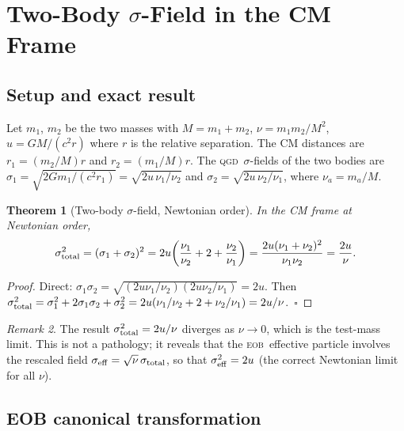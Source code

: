 \documentclass[11pt,a4paper]{article}
\theoremstyle{plain}
\newtheorem{theorem}{Theorem}[section]
\theoremstyle{remark}
\newtheorem{remark}[theorem]{Remark}
\newcommand{\QGD}{\textsc{qgd}}
\newcommand{\EOB}{\textsc{eob}}
\begin{document}
\section{Two-Body $\sigma$-Field in the CM Frame}

\subsection{Setup and exact result}

Let $m_1$, $m_2$ be the two masses with $M=m_1+m_2$, $\nu=m_1 m_2/M^2$,
$u=GM/(c^2 r)$ where $r$ is the relative separation.
The CM distances are $r_1 = (m_2/M)r$ and $r_2 = (m_1/M)r$.
The \QGD\ $\sigma$-fields of the two bodies are
$\sigma_1 = \sqrt{2Gm_1/(c^2 r_1)} = \sqrt{2u\,\nu_1/\nu_2}$ and
$\sigma_2 = \sqrt{2u\,\nu_2/\nu_1}$, where $\nu_a = m_a/M$.

\begin{theorem}[Two-body $\sigma$-field, Newtonian order]
\label{thm:twobody}
In the CM frame at Newtonian order,
\begin{equation}
  \sigma_{\rm total}^2 = (\sigma_1+\sigma_2)^2
  = 2u\!\left(\frac{\nu_1}{\nu_2}+2+\frac{\nu_2}{\nu_1}\right)
  = \frac{2u(\nu_1+\nu_2)^2}{\nu_1\nu_2}
  = \frac{2u}{\nu}.
  \label{eq:sigmatotal}
\end{equation}
\end{theorem}

\begin{proof}
Direct: $\sigma_1\sigma_2 = \sqrt{(2u\nu_1/\nu_2)(2u\nu_2/\nu_1)} = 2u$.
Then $\sigma_{\rm total}^2 = \sigma_1^2+2\sigma_1\sigma_2+\sigma_2^2 = 2u(\nu_1/\nu_2+2+\nu_2/\nu_1) = 2u/\nu$.~$\square$
\end{proof}

\begin{remark}
The result $\sigma_{\rm total}^2 = 2u/\nu$ diverges as $\nu\to0$, which is the
test-mass limit. This is not a pathology; it reveals that the \EOB\ effective
particle involves the rescaled field $\sigma_{\rm eff} = \sqrt{\nu}\,\sigma_{\rm total}$,
so that $\sigma_{\rm eff}^2 = 2u$ (the correct Newtonian limit for all $\nu$).
\end{remark}

\subsection{EOB canonical transformation}
\end{document}
